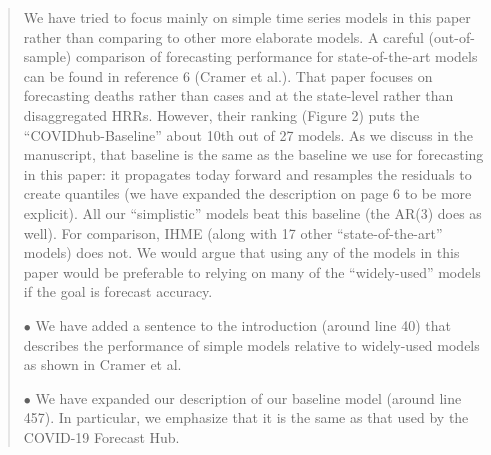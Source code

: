 \documentclass[11pt]{article}
\newenvironment{resp}{\begin{quote}\color{cobalt}}{\end{quote}}
\begin{document}
\begin{resp}
  We have tried to focus mainly on simple time series models in this paper
  rather than comparing to other more elaborate models. A careful
  (out-of-sample) comparison of forecasting performance for state-of-the-art
  models can be found in reference 6 (Cramer et al.). That paper focuses on
  forecasting deaths rather than cases and at the state-level rather than
  disaggregated HRRs. However, their ranking (Figure 2) puts the
  ``COVIDhub-Baseline'' about 10th out of 27 models. As we discuss in the
  manuscript, that baseline is 
  the
  same as the baseline we use for forecasting in this paper: it propagates today
  forward and resamples the residuals to create quantiles (we have expanded the
  description on page 6 to be more explicit). All our ``simplistic'' models beat
  this baseline (the AR(3) does as well). For comparison, IHME (along with 17 other
  ``state-of-the-art'' models) does not. We would argue that using any of the
  models in this paper would be preferable to relying on many of the
  ``widely-used'' models if the goal is forecast accuracy.

  $\bullet$ We have added a sentence to the introduction (around line 40) that
  describes the performance of simple models relative to widely-used models as
  shown in Cramer et al.

  $\bullet$ We have expanded our description of our baseline model (around line
  457). In particular, we emphasize that it is the same as that used by the
  COVID-19 Forecast Hub. 
\end{resp}
\end{document}

